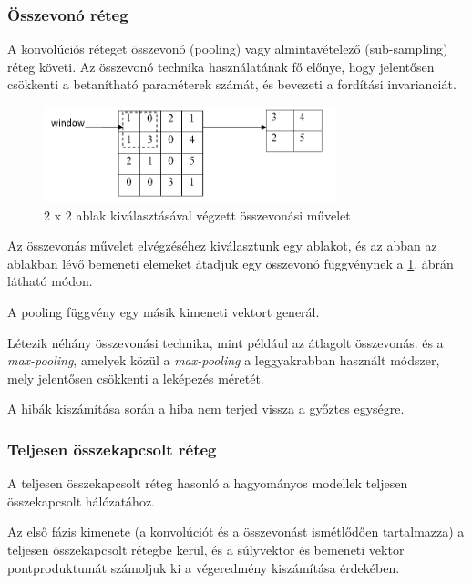 \documentclass[12pt,a4]{article}
\begin{document}
	\subsubsection{Összevonó réteg}

	A konvolúciós réteget összevonó (pooling) vagy 
	almintavételező (sub-sampling) \cite{CNN} réteg követi.
	Az összevonó technika használatának fő előnye, hogy 
	jelentősen csökkenti a betanítható paraméterek számát,
	és bevezeti a fordítási invarianciát. 

    \begin{figure}[h]	
		\centering
		\includegraphics[width=0.7\linewidth]{pooling}
		\caption{\cite{CNN} 2 x 2 ablak kiválasztásával végzett összevonási művelet}
        \label{fig:pooling}
	\end{figure}
 
	Az összevonás művelet elvégzéséhez kiválasztunk egy ablakot,
	és az abban az ablakban lévő bemeneti elemeket átadjuk
	egy összevonó függvénynek a \ref{fig:pooling}. ábrán látható módon.
	
	\newpage
	
	A pooling függvény egy másik kimeneti vektort generál.
	
	Létezik néhány összevonási technika, mint például az átlagolt összevonás. 
	és a \textit{max-pooling}, amelyek közül a \textit{max-pooling} a leggyakrabban használt módszer,
	mely jelentősen csökkenti a leképezés méretét.
	
	A hibák kiszámítása során a hiba nem terjed vissza a győztes egységre.
	
	\subsubsection{Teljesen összekapcsolt réteg}
	
	A teljesen összekapcsolt réteg \cite{CNN} hasonló a hagyományos modellek teljesen összekapcsolt hálózatához.
	
	Az első
	fázis kimenete (a konvolúciót és a összevonást ismétlődően tartalmazza) a teljesen összekapcsolt rétegbe kerül, és a súlyvektor és bemeneti vektor pontproduktumát számoljuk ki a végeredmény kiszámítása érdekében.
	
\end{document}

